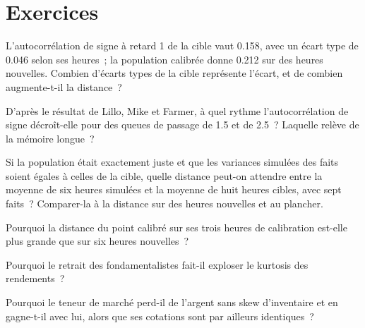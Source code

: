 \section{Exercices}

\begin{exercise}[$\star$]\label{exo:mx:build-an-agent-based-market:1}
L'autocorrélation de signe à retard 1 de la cible vaut 0.158, avec un écart type de 0.046 selon ses heures~; la population calibrée donne 0.212 sur des
heures nouvelles. Combien d'écarts types de la cible représente l'écart, et de combien augmente-t-il la distance~?
\end{exercise}

\begin{exercise}[$\star$]\label{exo:mx:build-an-agent-based-market:2}
D'après le résultat de Lillo, Mike et Farmer, à quel rythme l'autocorrélation de signe décroît-elle pour des queues de passage de 1.5 et de 2.5~? Laquelle relève de la mémoire longue~?
\end{exercise}

\begin{exercise}[$\star$]\label{exo:mx:build-an-agent-based-market:3}
Si la population était exactement juste et que les variances simulées des faits soient égales à celles de la cible, quelle distance peut-on attendre entre la moyenne de six
heures simulées et la moyenne de huit heures cibles, avec sept faits~? Comparer-la à la distance sur des heures nouvelles et au plancher.
\end{exercise}

\begin{exercise}[$\star\star$]\label{exo:mx:build-an-agent-based-market:4}
Pourquoi la distance du point calibré sur ses trois heures de calibration est-elle plus grande que sur six heures nouvelles~?
\end{exercise}

\begin{exercise}[$\star\star$]\label{exo:mx:build-an-agent-based-market:5}
Pourquoi le retrait des fondamentalistes fait-il exploser le kurtosis des rendements~?
\end{exercise}

\begin{exercise}[$\star\star$]\label{exo:mx:build-an-agent-based-market:6}
Pourquoi le teneur de marché perd-il de l'argent sans skew d'inventaire et en gagne-t-il avec lui, alors que ses cotations sont par ailleurs identiques~?
\end{exercise}

